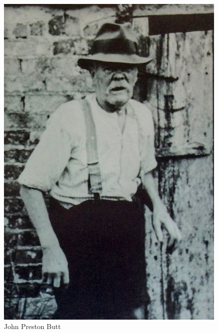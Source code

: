 
\begin{figure}
  \centering
  \includegraphics[width=.9\linewidth]{pictures/cropped/John Preston Butt.jpg}
  \caption*{John Preston Butt}
\end{figure}

